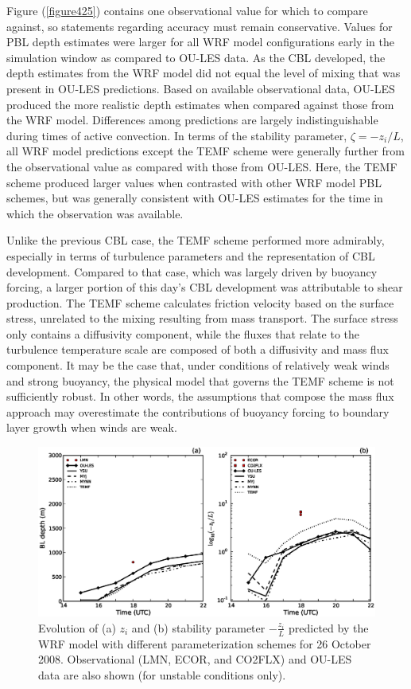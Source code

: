 Figure (\autoref{figure425}) contains one observational value for which to compare against, so statements regarding accuracy must remain conservative. Values for PBL depth estimates were larger for all WRF model configurations early in the simulation window as compared to OU-LES data. As the CBL developed, the depth estimates from the WRF model did not equal the level of mixing that was present in OU-LES predictions. Based on available observational data, OU-LES produced the more realistic depth estimates when compared against those from the WRF model. Differences among predictions are largely indistinguishable during times of active convection. In terms of the stability parameter, $\zeta = -z_i / L$, all WRF model predictions except the TEMF scheme were generally further from the observational value as compared with those from OU-LES. Here, the TEMF scheme produced larger values when contrasted with other WRF model PBL schemes, but was generally consistent with OU-LES estimates for the time in which the observation was available.

Unlike the previous CBL case, the TEMF scheme performed more admirably, especially in terms of turbulence parameters and the representation of CBL development. Compared to that case, which was largely driven by buoyancy forcing, a larger portion of this day's CBL development was attributable to shear production. The TEMF scheme calculates friction velocity based on the surface stress, unrelated to the mixing resulting from mass transport. The surface stress only contains a diffusivity component, while the fluxes that relate to the turbulence temperature scale are composed of both a diffusivity and mass flux component. It may be the case that, under conditions of relatively weak winds and strong buoyancy, the physical model that governs the TEMF scheme is not sufficiently robust. In other words, the assumptions that compose the mass flux approach may overestimate the contributions of buoyancy forcing to boundary layer growth when winds are weak.


\begin{figure}[ht!]
\begin{center}
\includegraphics[width=\textwidth]{figures/chapter4/pblh_phi_phys_20081026}
\end{center}
\caption{Evolution of (a) $z_i$ and (b) stability parameter $-\frac{z_i}{L}$ predicted by the WRF model with different parameterization schemes for 26 October 2008. Observational (LMN, ECOR, and CO2FLX) and OU-LES data are also shown (for unstable conditions only).}
\label{figure425}
\end{figure}


